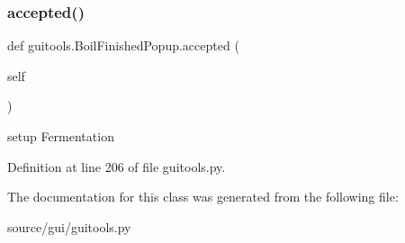 \subsubsection{\texorpdfstring{accepted()}{accepted()}}
{\footnotesize\ttfamily def guitools.\+Boil\+Finished\+Popup.\+accepted (\begin{DoxyParamCaption}\item[{}]{self }\end{DoxyParamCaption})}

\begin{DoxyVerb}setup Fermentation
\end{DoxyVerb}
 

Definition at line 206 of file guitools.\+py.



The documentation for this class was generated from the following file\+:\begin{DoxyCompactItemize}
\item 
source/gui/guitools.\+py\end{DoxyCompactItemize}
